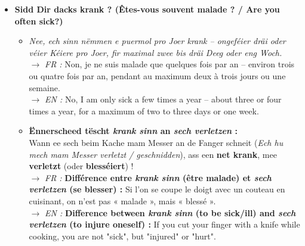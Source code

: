 \begin{itemize}
    \item \textbf{Sidd Dir dacks krank ? (Êtes-vous souvent malade ? / Are you often sick?)}
    \begin{itemize}
        \item \textit{Nee, ech sinn nëmmen e puermol pro Joer krank -- ongeféier dräi oder véier Kéiere pro Joer, fir maximal zwee bis dräi Deeg oder eng Woch.} \\
        $\rightarrow$ \textit{FR :} Non, je ne suis malade que quelques fois par an -- environ trois ou quatre fois par an, pendant au maximum deux à trois jours ou une semaine. \\
        $\rightarrow$ \textit{EN :} No, I am only sick a few times a year -- about three or four times a year, for a maximum of two to three days or one week.
        \item \textbf{Ënnerscheed tëscht \textit{krank sinn} an \textit{sech verletzen} :} \\
        Wann ee sech beim Kache mam Messer an de Fanger schneit (\textit{Ech hu mech mam Messer verletzt / geschnidden}), ass een \textbf{net krank}, mee \textbf{verletzt} (oder \textbf{blesséiert}) ! \\
        $\rightarrow$ \textit{FR :} \textbf{Différence entre \textit{krank sinn} (être malade) et \textit{sech verletzen} (se blesser) :} Si l'on se coupe le doigt avec un couteau en cuisinant, on n'est pas « malade », mais « blessé ». \\
        $\rightarrow$ \textit{EN :} \textbf{Difference between \textit{krank sinn} (to be sick/ill) and \textit{sech verletzen} (to injure oneself) :} If you cut your finger with a knife while cooking, you are not "sick", but "injured" or "hurt".
    \end{itemize}

    \vspace{0.4em}


\end{itemize}
